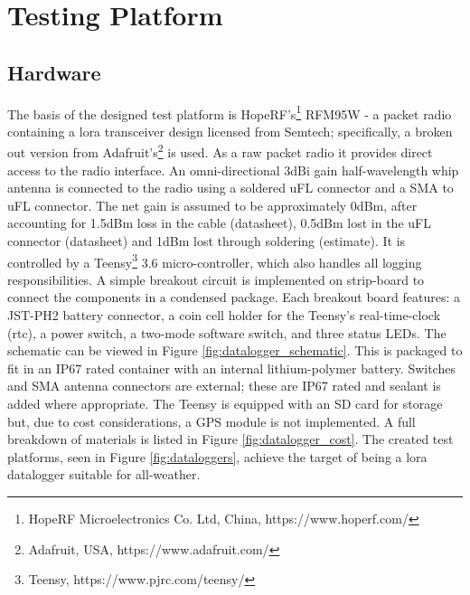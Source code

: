 \chapter{Testing  Platform}\label{sec:testing_platform}
\section{Hardware}
The basis of the designed test platform is HopeRF's\footnote{HopeRF Microelectronics Co. Ltd, China, https://www.hoperf.com/} RFM95W - a packet radio containing a \ac{lora} transceiver design licensed from Semtech; specifically, a broken out version from  Adafruit's\footnote{Adafruit, USA, https://www.adafruit.com/} is used. As a raw packet radio it provides direct access to the radio interface. An omni-directional 3dBi gain half-wavelength whip antenna is connected to the radio using a soldered uFL connector and a SMA to uFL connector. The net gain is assumed to be approximately 0dBm, after accounting for 1.5dBm loss in the cable (datasheet), 0.5dBm lost in the uFL connector (datasheet) and 1dBm lost through soldering (estimate). It is controlled by a Teensy\footnote{Teensy, https://www.pjrc.com/teensy/} 3.6 micro-controller, which also handles all logging responsibilities. A simple breakout circuit is implemented on strip-board to connect the components in a condensed package. Each breakout board features: a JST-PH2 battery connector, a coin cell holder for the Teensy's real-time-clock (\ac{rtc}), a power switch, a two-mode software switch, and three status LEDs. The schematic can be viewed in Figure \ref{fig:datalogger_schematic}. This is packaged to fit in an IP67 rated container with an internal lithium-polymer battery. Switches and SMA antenna connectors are external; these are IP67 rated and sealant is added where appropriate. The Teensy is equipped with an SD card for storage but, due to cost considerations, a GPS module is not implemented. A full breakdown of materials is listed in Figure \ref{fig:datalogger_cost}. The created test platforms, seen in Figure \ref{fig:dataloggers}, achieve the target of being a \ac{lora} datalogger suitable for all-weather.

